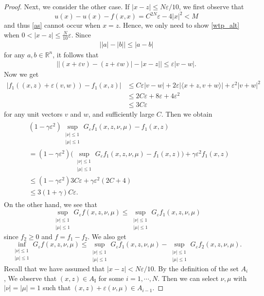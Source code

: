 \documentclass[english]{amsart}
\newcommand{\eps}{\varepsilon}
\theoremstyle{plain}
\theoremstyle{definition}
\theoremstyle{remark}
\numberwithin{equation}{section}
\begin{document}
\begin{proof}
Next, we consider the other case.
If $|x-z|\le N\eps/10$, 
we first observe that 
$$u(x)-u(x)-f(x,x)= C^{2N}\eps -4|x|^{2} <M$$
and thus \eqref{as} cannot occur when $x=z$. 
Hence, we only need to show \eqref{wtp_alt} when $0<|x-z| \le \frac{N}{10} \eps$.
Since
\begin{align*}
\big||a| -|b| \big| \le |a-b| 
\end{align*}
for any $a,b \in \mathbb{R}^{n}$, 
it follows that
\begin{align*}
\big||(x+\eps v)-(z+ \eps w)| -|x-z| \big| \le \eps |v-w| .
\end{align*}
Now we get
\begin{align*}
|f_{1}((x,z)+\eps (v,w))-f_{1}(x,z)| & \le 
C\eps |v-w| + 2\eps |\langle x+z,v+w \rangle|+\eps^{2}|v+w|^{2}
\\ & \le 2C\eps + 8\eps +4\eps^{2}
\\ & \le 3C\eps 
\end{align*}
for any unit vectors $v$ and $w$, and sufficiently large $C$. 
Then we obtain
\begin{align}\label{estf1}\begin{split}
&(1-\gamma\eps^2) \sup_{\substack{|\nu|\le1\\|\mu|\le1}}G_{\eps}f_{1}(x,z,\nu,\mu)-f_{1}(x,z) \\ & = (1-\gamma\eps^2)\bigg( \sup_{\substack{|\nu|\le1\\|\mu|\le1}}G_{\eps}f_{1}(x,z,\nu,\mu)-f_{1}(x,z) \bigg)+\gamma \eps^2 f_1(x,z)
\\ &\le (1-\gamma\eps^2)3C\eps +\gamma\eps^2 (2C+4)
\\ & \le 3(1+\gamma)C\eps .\end{split}
\end{align}
On the other hand, we see that
$$\sup_{\substack{|\nu|\le1\\|\mu|\le1}}G_{\eps}f(x,z,\nu,\mu) \le \sup_{\substack{|\nu|\le1\\|\mu|\le1}}G_{\eps}f_1(x,z,\nu,\mu)$$
since $f_{2}\ge 0$ and $f=f_{1}-f_{2}$.
We also get
$$  \inf_{\substack{|\nu|\le1\\|\mu|\le1}}G_{\eps}f(x,z,\nu,\mu) \le  \sup_{\substack{|\nu|\le1\\|\mu|\le1}}G_{\eps}f_1 (x,z,\nu,\mu)- \sup_{\substack{|\nu|\le1\\|\mu|\le1}}G_{\eps}f_2 (x,z,\nu,\mu).$$
Recall that we have assumed that $|x-z|<N\eps/10$.
By the definition of the set $A_i$, We observe that $(x,z) \in A_{\textrm{I}}$ for some $i=1,\cdots,N$.
Then we can select $\nu, \mu $ with $|\nu|=|\mu|=1 $ such that $(x,z)+\eps(\nu,\mu) \in A_{i-1}$.

\end{proof}
\end{document}
